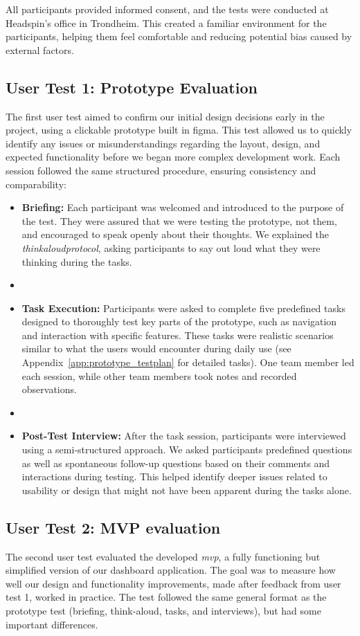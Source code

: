 All participants provided informed consent, and the tests were conducted at Headspin’s office in Trondheim. This created a familiar environment for the participants, helping them feel comfortable and reducing potential bias caused by external factors.

\subsection{User Test 1: Prototype Evaluation}
\label{subsec:user_test_1}
The first user test aimed to confirm our initial design decisions early in the project, using a clickable prototype built in \gls{figma}. This test allowed us to quickly identify any issues or misunderstandings regarding the layout, design, and expected functionality before we began more complex development work.
Each session followed the same structured procedure, ensuring consistency and comparability:

\begin{itemize}
    \item \textbf{Briefing:}
    Each participant was welcomed and introduced to the purpose of the test. They were assured that we were testing the prototype, not them, and encouraged to speak openly about their thoughts. We explained the \textit{\gls{thinkaloudprotocol}}, asking participants to say out loud what they were thinking during the tasks.
    \item[] 
    \item \textbf{Task Execution:}
    Participants were asked to complete five predefined tasks designed to thoroughly test key parts of the prototype, such as navigation and interaction with specific features. These tasks were realistic scenarios similar to what the users would encounter during daily use (see Appendix~\ref{app:prototype_testplan} for detailed tasks). One team member led each session, while other team members took notes and recorded observations.
    \item[] 
    \item \textbf{Post-Test Interview:}
    After the task session, participants were interviewed using a semi-structured approach. We asked participants predefined questions as well as spontaneous follow-up questions based on their comments and interactions during testing. This helped identify deeper issues related to usability or design that might not have been apparent during the tasks alone.
\end{itemize}

\subsection{User Test 2: MVP evaluation}
\label{subsec:user_test_2}
The second user test evaluated the developed \textit{\acrshort{mvp}}, a fully functioning but simplified version of our dashboard application. The goal was to measure how well our design and functionality improvements, made after feedback from user test 1, worked in practice.
The test followed the same general format as the prototype test (briefing, think-aloud, tasks, and interviews), but had some important differences. 

